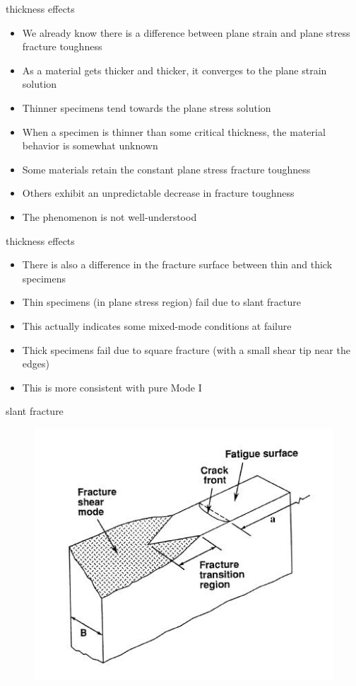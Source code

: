 \documentclass[10pt]{beamer}
\begin{document}
\begin{frame}{thickness effects}
	\begin{itemize}[<+->]
		\item We already know there is a difference between plane strain and plane stress fracture toughness
		\item As a material gets thicker and thicker, it converges to the plane strain solution
		\item Thinner specimens tend towards the plane stress solution
		\item When a specimen is thinner than some critical thickness, the material behavior is somewhat unknown
		\item Some materials retain the constant plane stress fracture toughness
		\item Others exhibit an unpredictable decrease in fracture toughness
		\item The phenomenon is not well-understood
	\end{itemize}
\end{frame}

\begin{frame}{thickness effects}
	\begin{itemize}[<+->]
		\item There is also a difference in the fracture surface between thin and thick specimens
		\item Thin specimens (in plane stress region) fail due to slant fracture
		\item This actually indicates some mixed-mode conditions at failure
		\item Thick specimens fail due to square fracture (with a small shear tip near the edges)
		\item This is more consistent with pure Mode I
	\end{itemize}
\end{frame}

\begin{frame}{slant fracture}
\begin{figure}
\centering
\includegraphics[width=0.7\linewidth]{slant}
\label{fig:slant}
\end{figure}
\end{frame}
\end{document}
